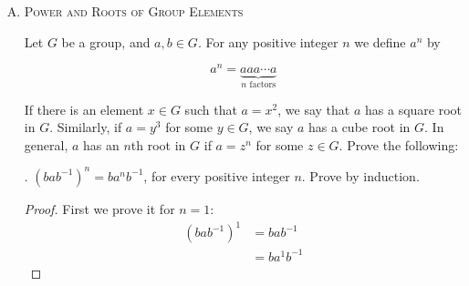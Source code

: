 \documentclass[twoside]{amsart}
\begin{document}
\begin{enumerate}[A.]
\begin{enumerate}[(a)]
\begin{verbatim}
      \end{verbatim}\normalsize

      . If $G$ and $H$ are abelian, prove that $G \times H$
      is abelian.

      \begin{proof}
      \begin{align*}
         (x,y)(x',y') & = (xx',yy') \\
	 (x',y')(x,y) & = (x'x,y'y) \\
	              & = (xx',yy') && \text{Commutativity on $G$ and $H$}
		      \qedhere
      \end{align*}
      \end{proof}

      . Suppose the groups $G$ and $H$ both have the following
      property:
      \begin{figure}[ht]
          \emph{Every element of the group is its own inverse}
      \end{figure}

      Prove that $G\times H$ has this property.

      \begin{proof}
         \begin{align*}
	    (a,b)(a,b) & = (aa,bb)  \\
	               & = (aa^{-1},bb^{-1}) && \text{Given} \\
		       & = (e_G,e_H) \qedhere
	 \end{align*}
      \end{proof}

   \end{enumerate}

   \item \textsc{Power and Roots of Group Elements}

   \noindent Let $G$ be a group, and $a,b\in G$. For any positive 
   integer $n$ we define $a^n$ by

   \[
      a^n = \underbrace{aaa\cdots a}_{n\text{ factors}}
   \]

   If there is an element $x \in G$ such that $a = x^2$, we say that
   $a$ has a square root in $G$. Similarly, if $a = y^3$ for some
   $y \in G$, we say $a$ has a cube root in $G$. In general, $a$ has
   an $n$th root in $G$ if $a=z^n$ for some $z \in G$. Prove the following:

   . $(bab^{-1})^n = ba^nb^{-1}$, for every positive integer $n$.
   Prove by induction. 
   \begin{proof}
   First we prove it for $n=1$:
      \begin{align*}
         (bab^{-1})^1 & = bab^{-1} \\
	              & = ba^1b^{-1}
      \end{align*}


\end{proof}
\end{enumerate}
\end{document}
